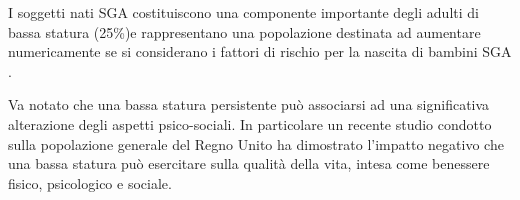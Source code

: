 I soggetti nati SGA costituiscono una componente importante degli adulti di bassa statura (25\%)e rappresentano una popolazione destinata ad aumentare numericamente se si considerano i fattori di rischio per la nascita di bambini SGA .

Va notato che una bassa statura persistente può associarsi ad una significativa alterazione degli aspetti psico-sociali.\cite{kelnar1990pride} In particolare un recente studio condotto sulla popolazione generale del Regno Unito ha dimostrato l'impatto negativo che una bassa statura può esercitare sulla qualità della vita, intesa come benessere fisico, psicologico e sociale\cite{christensen2007evaluation}. 
